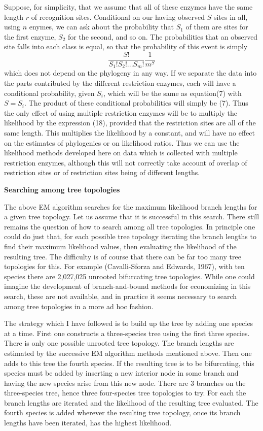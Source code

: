 Suppose, for simplicity, that we assume that all of these enzymes have the
same length $r$ of recognition sites.  Conditional on our having observed $S$
sites in all, using $n$ enymes, we can ask about the probability that $S_1$ of them are
sites for the first enzyme, $S_2$ for the second, and so on.  The probabilities
that an observed site falls into each class is equal, so that the probability
of this event is simply
\begin{equation} %
\frac{S!}{S_1! S_2! ... S_m!}\frac{1}{m^S}
\end{equation}
which does not depend on the phylogeny in any way.  If we separate the data
into the parts contributed by the different restriction enzymes, each will
have a conditional probability, given $S_i$, which will be the same as
equation(7) with $S = S_i$.  The product of these conditional probabilities
will simply be (7).  Thus the only effect of using multiple restriction
enzymes will be to multiply the likelihood by the expression (18), provided
that the restriction sites are all of the same length.  This multiplies
the likelihood by a constant, and
will have no effect on the estimates of phylogenies or on likelihood ratios.
Thus we can use the likelihood methods developed here on data which is
collected with multiple restriction enzymes, although this will not
correctly take account of overlap of restriction sites or of restriction
sites being of different lengths.
\bigskip

\centerline{\bf Searching among tree topologies}

The above EM algorithm searches for the maximum likelihood branch lengths for
a given tree topology.  Let us assume that it is successful in this search.
There still remains the question of how to search among all tree topologies.
In principle one could do just that, for each possible tree topology iterating
the branch lengths to find their maximum likelihood values, then evaluating the
likelihood of the resulting tree.  The difficulty is of course that there can
be far too many tree topologies for this.  For example (Cavalli-Sforza and
Edwards, 1967), with ten species there are 2,027,025 unrooted bifurcating
tree topologies.  While one could imagine the development of branch-and-bound
methods for economizing in this search, these are not available, and in
practice it seems necessary to search among tree topologies in a more
ad hoc fashion.

The strategy which I have followed is to build up the tree by adding one
species at a time.  First one constructs a three-species tree using the first
three species.  There is only one possible unrooted tree topology.  The branch
lengths are estimated by the successive EM algorithm methods mentioned above.
Then one adds to this tree the fourth species.  If the resulting tree is to
be bifurcating, this species must be added by inserting a new interior node
in some branch and having the new species arise from this new node.  There
are 3 branches on the three-species tree, hence three four-species tree
topologies to try.  For each the branch lengths are iterated and the
likelihood of the resulting tree evaluated.  The fourth species is added
wherever the resulting tree topology, once its branch lengths have been
iterated, has the highest likelihood.  

